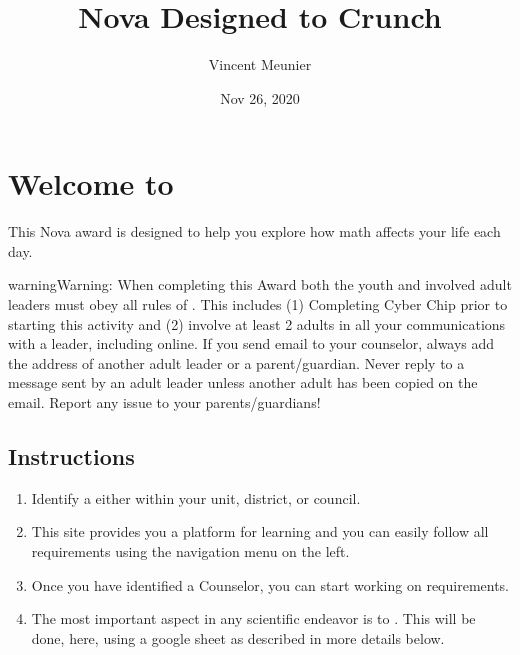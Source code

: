 \documentclass[letterpaper,10pt,english,openany,oneside]{sphinxmanual}
\title{Nova \sphinxhyphen{} Designed to Crunch}
\date{Nov 26, 2020}
\author{Vincent Meunier}
\begin{document}
\pagestyle{empty}
\sphinxmaketitle
\pagestyle{plain}
\sphinxtableofcontents
\pagestyle{normal}
\label{\detokenize{index::doc}}



\chapter{Welcome to }
\label{\detokenize{introduction:welcome-to-designed-to-crunch}}\label{\detokenize{introduction:introduction}}\label{\detokenize{introduction::doc}}
This Nova award is designed to help you explore how math affects your life each day.

\begin{sphinxadmonition}{warning}{Warning:}
When completing this Award both the youth and involved adult leaders must obey all rules of . This includes (1) Completing Cyber Chip prior to starting this activity and (2)  involve at least 2 adults in all your communications with a leader, including online. If you send email to your counselor, always add the address of another adult leader or a parent/guardian. Never reply to a message sent by an adult leader unless another adult has been copied on the email. Report any issue to your parents/guardians!
\end{sphinxadmonition}


\section{Instructions}
\label{\detokenize{introduction:instructions}}\begin{enumerate}
%
\item {} 
Identify a  either within your unit, district, or council.

\item {} 
This site provides you a platform for learning and you can easily follow all requirements using the navigation menu on the left.

\item {} 
Once you have identified a Counselor, you can start working on requirements.

\item {} 
The most important aspect in any scientific endeavor is to . This will be done, here, using a google sheet as described in more details below.

\end{enumerate}
\end{document}
